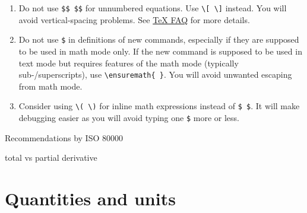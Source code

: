 \documentclass[12pt,a4paper]{article}
\begin{document}
\begin{enumerate}
\item Do not use \verb_$$ $$_ for unnumbered equations.
Use \verb_\[ \]_ instead.
You will avoid vertical-spacing problems.
See \href{https://texfaq.org/FAQ-dolldoll.html}{\TeX{} FAQ} for more details.

\item Do not use \verb_$_ in definitions of new commands, especially if they are supposed to be used in math mode only.
If the new command is supposed to be used in text mode but requires features of the math mode (typically sub-/superscripts), use \verb_\ensuremath{ }_.
You will avoid unwanted escaping from math mode.

\item Consider using \verb_\( \)_ for inline math expressions instead of \verb_$ $_.
It will make debugging easier as you will avoid typing one \verb!$! more or less.
\end{enumerate}

Recommendations by ISO 80000~\cite{iso-80000-2}

total vs partial derivative

\section{Quantities and units}
\end{document}
